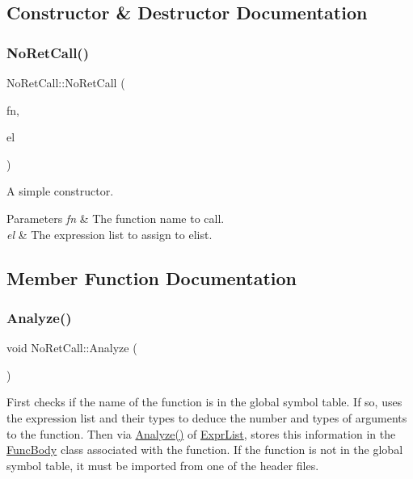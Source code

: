 \subsection{Constructor \& Destructor Documentation}
\mbox{\label{class_no_ret_call_adb7fef6a0a2f27c75f9c73c164ea20a2}} 
\subsubsection{\texorpdfstring{No\+Ret\+Call()}{NoRetCall()}}
{\footnotesize\ttfamily No\+Ret\+Call\+::\+No\+Ret\+Call (\begin{DoxyParamCaption}\item[{const char $\ast$}]{fn,  }\item[{\hyperlink{class_expr_list}{Expr\+List} $\ast$}]{el }\end{DoxyParamCaption})}

A simple constructor. 
\begin{DoxyParams}{Parameters}
{\em fn} & The function name to call. \\
\hline
{\em el} & The expression list to assign to elist. \\
\hline
\end{DoxyParams}


\subsection{Member Function Documentation}
\mbox{\label{class_no_ret_call_a9714a8c4429eb932be749909b47394fa}} 
\subsubsection{\texorpdfstring{Analyze()}{Analyze()}}
{\footnotesize\ttfamily void No\+Ret\+Call\+::\+Analyze (\begin{DoxyParamCaption}{ }\end{DoxyParamCaption})\hspace{0.3cm}{\ttfamily [virtual]}}

First checks if the name of the function is in the global symbol table. If so, uses the expression list and their types to deduce the number and types of arguments to the function. Then via \hyperlink{class_no_ret_call_a9714a8c4429eb932be749909b47394fa}{Analyze()} of \hyperlink{class_expr_list}{Expr\+List}, stores this information in the \hyperlink{class_func_body}{Func\+Body} class associated with the function. If the function is not in the global symbol table, it must be imported from one of the header files. 

